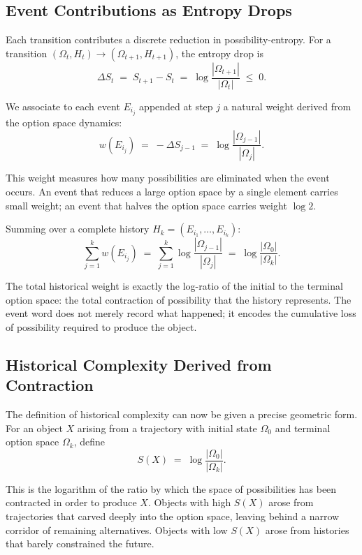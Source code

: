 \documentclass[12pt]{article}
\theoremstyle{plain}
\theoremstyle{definition}
\theoremstyle{remark}
\begin{document}
\subsection{Event Contributions as Entropy Drops}

Each transition contributes a discrete reduction in possibility-entropy.  For
a transition $(\Omega_t, H_t) \to (\Omega_{t+1}, H_{t+1})$, the entropy
drop is
\[
  \Delta S_t \;=\; S_{t+1} - S_t
  \;=\; \log \frac{|\Omega_{t+1}|}{|\Omega_t|} \;\leq\; 0.
\]

We associate to each event $E_{i_j}$ appended at step $j$ a natural weight
derived from the option space dynamics:
\[
  w(E_{i_j}) \;=\; -\Delta S_{j-1}
  \;=\; \log \frac{|\Omega_{j-1}|}{|\Omega_j|}.
\]

This weight measures how many possibilities are eliminated when the event
occurs.  An event that reduces a large option space by a single element carries
small weight; an event that halves the option space carries weight $\log 2$.

Summing over a complete history $H_k = (E_{i_1}, \dots, E_{i_k})$:
\[
  \sum_{j=1}^{k} w(E_{i_j})
  \;=\; \sum_{j=1}^{k} \log \frac{|\Omega_{j-1}|}{|\Omega_j|}
  \;=\; \log \frac{|\Omega_0|}{|\Omega_k|}.
\]

The total historical weight is exactly the log-ratio of the initial to the
terminal option space: the total contraction of possibility that the history
represents.  The event word does not merely record what happened; it encodes
the cumulative loss of possibility required to produce the object.

\subsection{Historical Complexity Derived from Contraction}

The definition of historical complexity can now be given a precise geometric
form.  For an object $X$ arising from a trajectory with initial state
$\Omega_0$ and terminal option space $\Omega_k$, define
\[
  S(X) \;=\; \log \frac{|\Omega_0|}{|\Omega_k|}.
\]

This is the logarithm of the ratio by which the space of possibilities has
been contracted in order to produce $X$.  Objects with high $S(X)$ arose
from trajectories that carved deeply into the option space, leaving behind a
narrow corridor of remaining alternatives.  Objects with low $S(X)$ arose
from histories that barely constrained the future.
\end{document}
